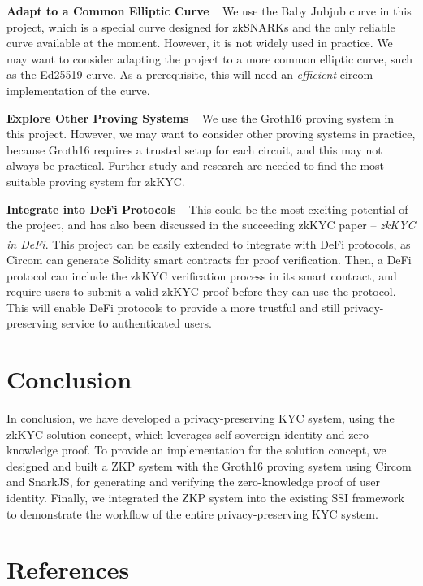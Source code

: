 \documentclass[
]{report}
\begin{document}
\textbf{Adapt to a Common Elliptic Curve} ~ We use the Baby Jubjub curve
in this project, which is a special curve designed for zkSNARKs and the
only reliable curve available at the moment. However, it is not widely
used in practice. We may want to consider adapting the project to a more
common elliptic curve, such as the Ed25519 curve. As a prerequisite,
this will need an \emph{efficient} circom implementation of the curve.

\textbf{Explore Other Proving Systems} ~ We use the Groth16 proving
system in this project. However, we may want to consider other proving
systems in practice, because Groth16 requires a trusted setup for each
circuit, and this may not always be practical. Further study and
research are needed to find the most suitable proving system for zkKYC.

\textbf{Integrate into DeFi Protocols} ~ This could be the most exciting
potential of the project, and has also been discussed in the succeeding
zkKYC paper -- \emph{zkKYC in DeFi}\textsuperscript{\cite{cryptoeprint:2022/321}}.
This project
can be easily extended to integrate with DeFi protocols, as Circom can
generate Solidity smart contracts for proof verification. Then, a DeFi
protocol can include the zkKYC verification process in its smart
contract, and require users to submit a valid zkKYC proof before they
can use the protocol. This will enable DeFi protocols to provide a more
trustful and still privacy-preserving service to authenticated users.

\chapter{Conclusion}

In conclusion, we have developed a privacy-preserving KYC system, using
the zkKYC solution concept, which leverages self-sovereign identity and
zero-knowledge proof. To provide an implementation for the solution
concept, we designed and built a ZKP system with the Groth16 proving
system using Circom and SnarkJS, for generating and verifying the
zero-knowledge proof of user identity. Finally, we integrated the ZKP
system into the existing SSI framework to demonstrate the workflow of
the entire privacy-preserving KYC system.

\chapter{References}
\printbibliography[heading=none]
\end{document}
